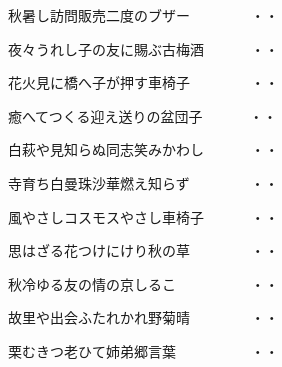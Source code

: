 \vspace{0.4cm}
\begin{shiika}秋暑し訪問販売二度のブザー　　　　
\hfill{・・}\end{shiika}
\vspace{0.4cm}
\begin{shiika}夜々うれし子の友に賜ぶ古梅酒　　　
\hfill{・・}\end{shiika}
\vspace{0.4cm}
\begin{shiika}花火見に橋へ子が押す車椅子　　　　
\hfill{・・}\end{shiika}
\vspace{0.4cm}
\begin{shiika}癒へてつくる迎え送りの盆団子　　　
\hfill{・・}\end{shiika}
\vspace{0.4cm}
\begin{shiika}白萩や見知らぬ同志笑みかわし　　　
\hfill{・・}\end{shiika}
\vspace{0.4cm}
\begin{shiika}寺育ち白曼珠沙華燃え知らず　　　　
\hfill{・・}\end{shiika}
\vspace{0.4cm}
\begin{shiika}風やさしコスモスやさし車椅子　　　
\hfill{・・}\end{shiika}
\vspace{0.4cm}
\begin{shiika}思はざる花つけにけり秋の草　　　　
\hfill{・・}\end{shiika}
\vspace{0.4cm}
\begin{shiika}秋冷ゆる友の情の京しるこ　　　　　
\hfill{・・}\end{shiika}
\vspace{0.4cm}
\begin{shiika}故里や出会ふたれかれ野菊晴　　　　
\hfill{・・}\end{shiika}
\vspace{0.4cm}
\begin{shiika}栗むきつ老ひて姉弟郷言葉　　　　　
\hfill{・・}\end{shiika}
